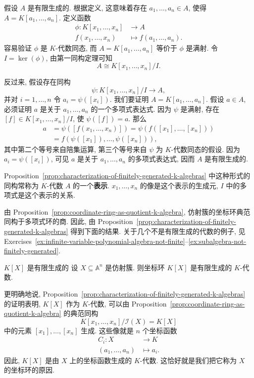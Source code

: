 \begin{Proof}
  假设 $A$ 是有限生成的. 根据定义, 这意味着存在 $a_{1},\ldots,a_{n}\in A$, 使得 $A=K[a_{1},\ldots,a_{n}]$. 定义函数
  \[
    \begin{aligned}
      \phi:K[x_{1},\ldots,x_{n}]&\to A\\
      f(x_{1},\ldots,x_{n})&\mapsto f(a_{1},\ldots,a_{n}).
    \end{aligned}
  \]
  容易验证 $\phi$ 是 $K$-代数同态, 而 $A=K[a_{1},\ldots,a_{n}]$ 等价于 $\phi$ 是满射. 令 $I=\ker(\phi)$, 由第一同构定理可知
  \[
    A\cong K[x_{1},\ldots,x_{n}]/I.
  \]

  反过来, 假设存在同构
  \[
    \psi:K[x_{1},\ldots,x_{n}]/I\to A,
  \]
  并对 $i=1,\ldots,n$ 令 $a_{i}=\psi([x_{i}])$. 我们要证明 $A=K[a_{1},\ldots,a_{n}]$. 假设 $a\in A$, 必须证明 $a$ 是关于 $a_{1},\ldots,a_{n}$ 的一个多项式表达式. 因为 $\psi$ 是满射, 存在 $[f]\in K[x_{1},\ldots,x_{n}]/I$, 使 $\psi([f])=a$. 那么
  \[
    \begin{aligned}
      a&=\psi([f(x_{1},\ldots,x_{n})])=\psi(f([x_{1}],\ldots,[x_{n}]))\\
       &=f(\psi([x_{1}]),\ldots,\psi([x_{n}])),
    \end{aligned}
  \]
  其中第二个等号来自陪集运算, 第三个等号来自 $\psi$ 为 $K$-代数同态的假设. 因为 $a_{i}=\psi([x_{i}])$, 可见 $a$ 是关于 $a_{1},\ldots,a_{n}$ 的多项式表达式, 因而 $A$ 是有限生成的.
\end{Proof}

Proposition~\ref{prop:characterization-of-finitely-generated-k-algebras} 中这种形式的同构常称为 $K$-代数 $A$ 的一个\textbf{表示}. $x_{1},\ldots,x_{n}$ 的像是这个表示的生成元, $I$ 中的多项式是这个表示的关系.

\BookPairedNote
  {由 Proposition~\ref{prop:coordinate-ring-as-quotient-k-algebra}, 仿射簇的坐标环典范同构于多项式环的商. 因此, 由 Proposition~\ref{prop:characterization-of-finitely-generated-k-algebras} 得到下面的结果.}
  {关于几个不是有限生成的代数的例子, 见 Exercises~\ref{ex:infinite-variable-polynomial-algebra-not-finite}--\ref{ex:subalgebra-not-finitely-generated}.}

\begin{Corollary}{{\textmd{$K[X]$} 是有限生成的}}\leavevmode\label{cor:coordinate-ring-finitely-generated}
  设 $X\subseteq\mathbb{A}^{n}$ 是仿射簇. 则坐标环 $K[X]$ 是有限生成的 $K$-代数.
\end{Corollary}

更明确地说, Proposition~\ref{prop:characterization-of-finitely-generated-k-algebras} 的证明表明, $K[X]$ 作为 $K$-代数, 可以由 Proposition~\ref{prop:coordinate-ring-as-quotient-k-algebra} 的典范同构
\[
  K[x_{1},\ldots,x_{n}]/\mathcal{I}(X)=K[X]
\]
中的元素 $[x_{1}],\ldots,[x_{n}]$ 生成. 这些像就是 $n$ 个坐标函数
\[
  \begin{aligned}
    C_{i}:X&\to K\\
    (a_{1},\ldots,a_{n})&\mapsto a_{i}.
  \end{aligned}
\]
因此, $K[X]$ 是由 $X$ 上的坐标函数生成的 $K$-代数. 这恰好就是我们把它称为 $X$ 的\textquotedbl{}坐标环\textquotedbl{}的原因.

